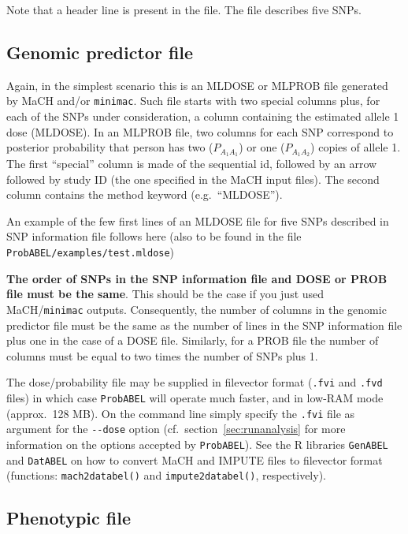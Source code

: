 \documentclass[12pt,a4paper]{article}
\newcommand{\GA}{\texttt{GenABEL}}
\newcommand{\DA}{\texttt{DatABEL}}
\begin{document}

Note that a header line is present in the file. The file describes
five SNPs.

\subsection{Genomic predictor file}
\label{ssec:dosein}

Again, in the simplest scenario this is an MLDOSE or MLPROB file
generated by MaCH and/or \texttt{minimac}.  Such file starts with two
special columns plus, for each of the SNPs under consideration, a
column containing the estimated allele 1 dose (MLDOSE).  In an MLPROB
file, two columns for each SNP correspond to posterior probability
that person has two ($P_{A_1A_1}$) or one ($P_{A_1A_2}$) copies of
allele 1.  The first ``special'' column is made of the sequential id,
followed by an arrow followed by study ID (the one specified in the
MaCH input files). The second column contains the method keyword
(e.g.~``MLDOSE'').

An example of the few first lines of an MLDOSE file for
five SNPs described in SNP information file follows here (also
to be found in the file \texttt{ProbABEL/examples/test.mldose})




\textbf{The order of SNPs in the SNP information file and DOSE or PROB
  file must be the same}. This should be the case if you just used
MaCH/\texttt{minimac} outputs.
Consequently, the number of columns in the genomic predictor file
must be the same as the number of lines in the SNP information file
plus one in the case of a DOSE file. Similarly, for a PROB file the
number of columns must be equal to two times the number of SNPs plus
1.

The dose/probability file may be supplied in filevector format
(\texttt{.fvi} and \texttt{.fvd} files) in which case
\texttt{ProbABEL} will operate much faster, and in low-RAM mode
(approx.~128 MB). On the command line simply specify the \texttt{.fvi}
file as argument for the \lstinline{--dose} option
(cf.~section~\ref{sec:runanalysis} for more information on the options
accepted by \texttt{ProbABEL}). See the R libraries \GA{} and
\DA{} on how to convert MaCH and IMPUTE files to
filevector format (functions: \texttt{mach2databel()} and
\texttt{impute2databel()}, respectively).


\subsection{Phenotypic file}
\label{ssec:phenoin}
\end{document}
